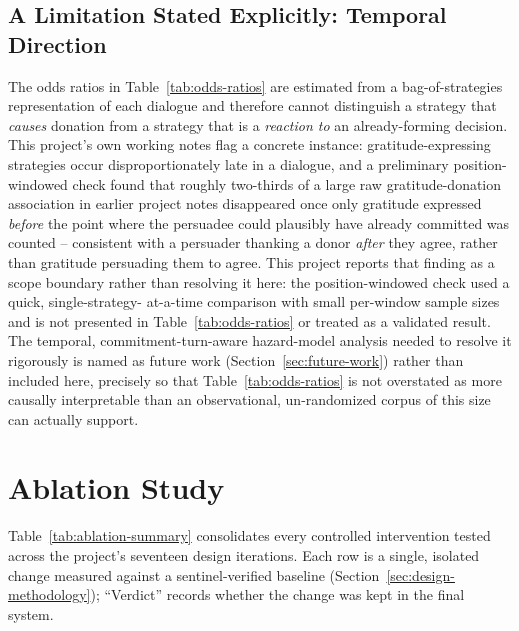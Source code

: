 \subsection{A Limitation Stated Explicitly: Temporal Direction}

The odds ratios in Table~\ref{tab:odds-ratios} are estimated from a
bag-of-strategies representation of each dialogue and therefore cannot
distinguish a strategy that \emph{causes} donation from a strategy that is a
\emph{reaction to} an already-forming decision. This project's own working
notes flag a concrete instance: gratitude-expressing strategies occur
disproportionately late in a dialogue, and a preliminary position-windowed
check found that roughly two-thirds of a large raw gratitude-donation
association in earlier project notes disappeared once only gratitude
expressed \emph{before} the point where the persuadee could plausibly have
already committed was counted -- consistent with a persuader thanking a
donor \emph{after} they agree, rather than gratitude persuading them to
agree. This project reports that finding as a scope boundary rather than
resolving it here: the position-windowed check used a quick, single-strategy-
at-a-time comparison with small per-window sample sizes and is not presented
in Table~\ref{tab:odds-ratios} or treated as a validated result. The
temporal, commitment-turn-aware hazard-model analysis needed to resolve it
rigorously is named as future work (Section~\ref{sec:future-work}) rather
than included here, precisely so that Table~\ref{tab:odds-ratios} is not
overstated as more causally interpretable than an observational, un-randomized
corpus of this size can actually support.

\section{Ablation Study}
\label{sec:ablation-summary}

Table~\ref{tab:ablation-summary} consolidates every controlled intervention
tested across the project's seventeen design iterations. Each row is a
single, isolated change measured against a sentinel-verified baseline
(Section~\ref{sec:design-methodology}); ``Verdict'' records whether the
change was kept in the final system.

